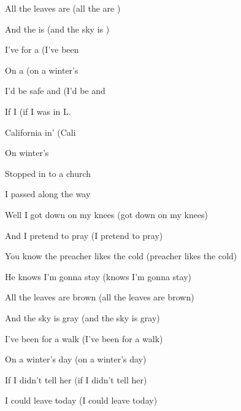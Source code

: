 
\zs
All {the} leaves are  (all the  are )

And the  is  (and the sky is )

I've  for a  (I've been  

On a    (on a winter's 

I'd {be} safe and  (I'd be  and 

If I    (if I was in L.

\ks

\zr
Cali{fornia} in' (Cali 

On  winter's  
\kr

\zs
Stopped in to a church

I passed along the way

Well I got down on my knees (got down on my knees)

And I pretend to pray (I pretend to pray)

You know the preacher likes the cold (preacher likes the cold)

He knows I'm gonna stay (knows I'm gonna stay)

\ks
\zr

\kr
\zs

All the leaves are brown (all the leaves are brown)

And the sky is gray   (and the sky is gray)

I've been for a walk (I've been for a walk)

On a winter's day  (on a winter's day)

If I didn't tell her   (if I didn't tell her)

I could leave today (I could leave today)

\ks

\zr
\kr

\zr
\kr
\kp


